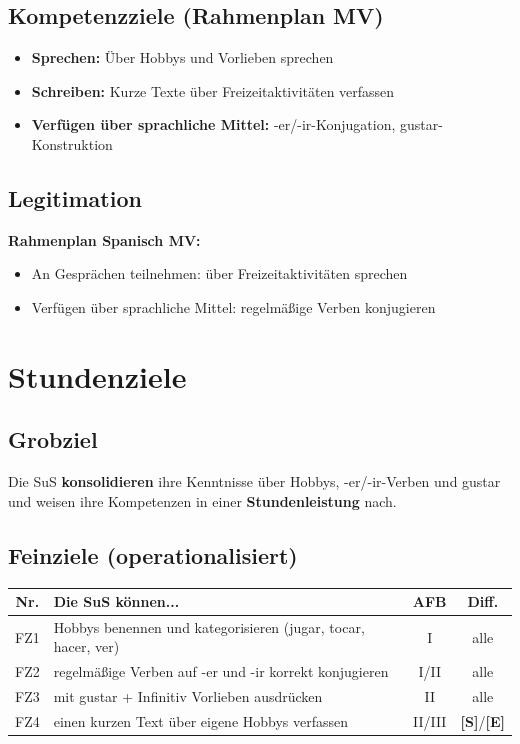 \documentclass[11pt,a4paper]{article}
\newcommand{\Std}{\textcolor{standard}{\textbf{[S]}}}
\newcommand{\E}{\textcolor{erweiterung}{\textbf{[E]}}}
\begin{document}
\subsection{Kompetenzziele (Rahmenplan MV)}
\begin{itemize}
    \item \textbf{Sprechen:} Über Hobbys und Vorlieben sprechen
    \item \textbf{Schreiben:} Kurze Texte über Freizeitaktivitäten verfassen
    \item \textbf{Verfügen über sprachliche Mittel:} -er/-ir-Konjugation, gustar-Konstruktion
\end{itemize}

\subsection{Legitimation}
\textbf{Rahmenplan Spanisch MV:}
\begin{itemize}
    \item An Gesprächen teilnehmen: über Freizeitaktivitäten sprechen
    \item Verfügen über sprachliche Mittel: regelmäßige Verben konjugieren
\end{itemize}

\section{Stundenziele}

\subsection{Grobziel}
Die SuS \textbf{konsolidieren} ihre Kenntnisse über Hobbys, -er/-ir-Verben und gustar und weisen ihre Kompetenzen in einer \textbf{Stundenleistung} nach.

\subsection{Feinziele (operationalisiert)}
\begin{tabular}{|c|p{8cm}|c|c|}
\hline
\textbf{Nr.} & \textbf{Die SuS können...} & \textbf{AFB} & \textbf{Diff.} \\
\hline
FZ1 & Hobbys benennen und kategorisieren (jugar, tocar, hacer, ver) & I & alle \\
\hline
FZ2 & regelmäßige Verben auf -er und -ir korrekt konjugieren & I/II & alle \\
\hline
FZ3 & mit gustar + Infinitiv Vorlieben ausdrücken & II & alle \\
\hline
FZ4 & einen kurzen Text über eigene Hobbys verfassen & II/III & \Std{}/\E{} \\
\hline
\end{tabular}
\end{document}
